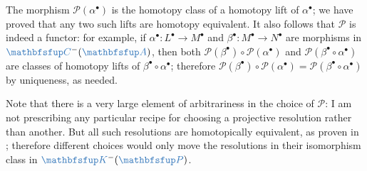 The morphism $\mathscr{P}(\alpha^\bullet)$ is the homotopy class of a
homotopy lift of $\alpha^\bullet$; we have proved that any two such
lifts are homotopy equivalent. It also follows that $\mathscr{P}$ is
indeed a functor: for example, if
$\alpha^\bullet : L^\bullet \to M^\bullet$ and
$\beta^\bullet : M^\bullet \to N^\bullet$ are morphisms in
$\categ{C}^-(\categ{A})$, then both
$\mathscr{P}(\beta^\bullet) \circ \mathscr{P}(\alpha^\bullet)$ and
$\mathscr{P}(\beta^\bullet \circ \alpha^\bullet)$ are classes of
homotopy lifts of $\beta^\bullet \circ \alpha^\bullet$; therefore
$\mathscr{P}(\beta^\bullet) \circ \mathscr{P}(\alpha^\bullet) =
\mathscr{P}(\beta^\bullet \circ \alpha^\bullet)$ by uniqueness, as
needed.

Note that there is a very large element of arbitrariness in the choice
of $\mathscr{P}$: I am not prescribing any particular recipe for
choosing a projective resolution rather than another. But all such
resolutions are homotopically equivalent, as proven in
; therefore different choices would only
move the resolutions in their isomorphism class in
$\categ{K}^-(\categ{P})$.

